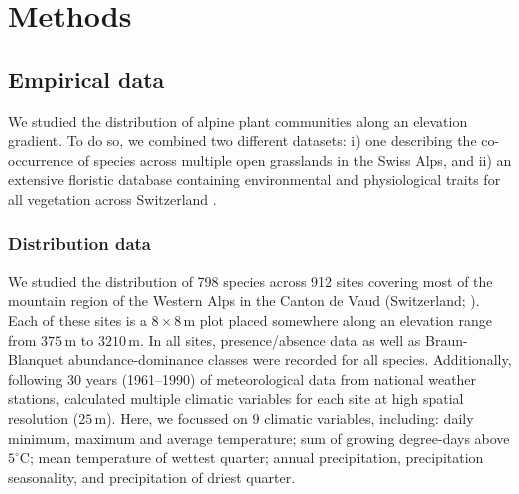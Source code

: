 \documentclass[11pt, a4paper]{article}
\begin{document}
\section*{Methods}
\subsection*{Empirical data}
We studied the distribution of alpine plant communities along an elevation gradient. To do so, we combined two different datasets: i) one describing the co-occurrence of species across multiple open grasslands in the Swiss Alps, and ii) an extensive floristic database containing environmental and physiological traits for all vegetation across Switzerland \citep{landoltFloraIndicativaOkologische2010}. 

\subsubsection*{Distribution data}
We studied the distribution of 798 species across 912 sites covering most of the mountain region of the Western Alps in the Canton de Vaud (Switzerland; \citealt{scherrerEcologicalIndicatorValues2019}). Each of these sites is a $8\times 8\,\text{m}$ plot placed somewhere along an elevation range from $375\,\text{m}$ to $3210\,\text{m}$. In all sites, presence/absence data as well as Braun-Blanquet abundance-dominance classes were recorded for all species. Additionally, following 30 years (1961–1990) of meteorological data from national weather stations, \citet{scherrerEcologicalIndicatorValues2019} calculated multiple climatic variables for each site at high spatial resolution ($25\,\text{m}$). Here, we focussed on 9 climatic variables, including: daily minimum, maximum and average temperature; sum of growing degree-days above $5^{\circ}\text{C}$; mean temperature of wettest quarter; annual precipitation, precipitation seasonality, and precipitation of driest quarter. %
\end{document}
